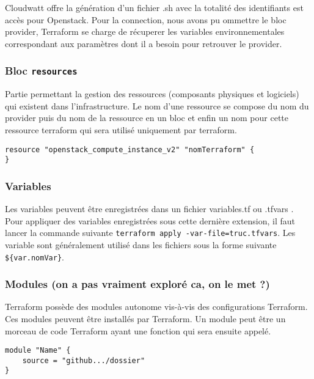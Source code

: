 \documentclass[]{article}
\begin{document}
Cloudwatt offre la génération d'un fichier .sh avec la totalité des
identifiants est accès pour Openstack. Pour la connection, nous avons pu
ommettre le bloc provider, Terraform se charge de récuperer les
variables environnementales correspondant aux paramètres dont il a
besoin pour retrouver le provider.

\subsubsection{\texorpdfstring{Bloc
\textbf{\texttt{resources}}}{Bloc resources}}\label{bloc-resources}

Partie permettant la gestion des ressources (composants physiques et
logiciels) qui existent dans l'infrastructure. Le nom d'une ressource se
compose du nom du provider puis du nom de la ressource en un bloc et
enfin un nom pour cette ressource terraform qui sera utilisé uniquement
par terraform.

\begin{verbatim}
resource "openstack_compute_instance_v2" "nomTerraform" {
}
\end{verbatim}

\subsubsection{Variables}\label{variables}

Les variables peuvent être enregistrées dans un fichier \og variables.tf
\fg ou \og .tfvars \fg. Pour appliquer des variables enregistrées sous
cette dernière extension, il faut lancer la commande suivante
\texttt{terraform\ apply\ -var-file=truc.tfvars}. Les variable sont
généralement utilisé dans les fichiers sous la forme suivante
\texttt{\$\{var.nomVar\}}.

\subsubsection{Modules (on a pas vraiment exploré ca, on le met
?)}\label{modules-on-a-pas-vraiment-exploruxe9-ca-on-le-met}

Terraform possède des modules autonome vis-à-vis des configurations
Terraform. Ces modules peuvent être installés par Terraform. Un module
peut être un morceau de code Terraform ayant une fonction qui sera
ensuite appelé.

\begin{verbatim}
module "Name" {
    source = "github.../dossier"
}
\end{verbatim}
\end{document}
